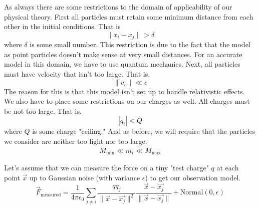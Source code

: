 \documentclass[book.tex]{subfiles}
\begin{document}
As always there are some restrictions to the domain of applicability of our physical theory. First all particles must retain some minimum distance from each other in the initial conditions. That is 
\begin{equation}
\|x_i - x_j\| > \delta
\end{equation}
where $\delta$ is some small number. This restriction is due to the fact that the model as point particles doesn't make sense at very small distances. For an accurate model in this domain, we have to use quantum mechanics. Next, all particles must have velocity that isn't too large. That is,
\begin{equation}
\|v_i \| \ll c
\end{equation}
The reason for this is that this model isn't set up to handle relativistic effects. We also have to place some restrictions on our charges as well. All charges must be not too large. That is,
\begin{equation}
|q_i| < Q
\end{equation}
where $Q$ is some charge "ceiling." And as before, we will require that the particles we consider are neither too light nor too large.
\begin{align}
    M_{\textrm{min}} \ll m_i \ll M_{\textrm{max}}
\end{align}

Let's assume that we can measure the force on a tiny "test charge" $q$ at each point $\vec{x}$ up to Gaussian noise (with variance $\epsilon$) to get our observation model. 
\begin{equation}
\vec{F}_{\textrm{measured}} = \frac{1}{4 \pi \epsilon_0} \sum_{j \neq i} \frac{qq_j}{\|\vec{x} - \vec{x_j}\|^2} \frac{\vec{x} - \vec{x_j}}{\|\vec{x} - \vec{x_j}\|} + \textrm{Normal}(0, \epsilon)
\end{equation}
\end{document}
